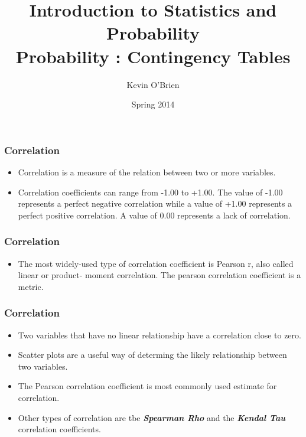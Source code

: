 \documentclass[a4]{beamer}
\title[Stats-Lab.com]{\LARGE Introduction to Statistics and Probability \\ {\Large Probability : Contingency Tables}}
\author[Kevin O'Brien]{Kevin O'Brien}
\date{Spring 2014}
\begin{document}
\begin{frame}
\titlepage
\end{frame}
%
\begin{frame}
\frametitle{Correlation}
\Large
\begin{itemize}
\item Correlation is a measure of the relation between two or more variables. 
\item Correlation coefficients can range from -1.00 to +1.00. The value of -1.00 represents a perfect negative correlation while a value of +1.00 represents a perfect positive correlation. A value of 0.00 represents a lack of correlation.
\end{itemize}
 


\end{frame}
\begin{frame}
\frametitle{Correlation}
\Large
\begin{itemize}

\item 
The most widely-used type of correlation coefficient is Pearson r, also called linear or product- moment correlation.
The pearson correlation coefficient is a metric.
\end{itemize}
 


\end{frame}

\begin{frame}
\frametitle{Correlation}
\Large
\begin{itemize}
\item  Two variables that have no linear relationship have a correlation close to zero. 

\item Scatter plots are a useful way of determing the likely relationship between two variables. 

\item The Pearson correlation coefficient is most commonly used estimate for correlation. 

\item Other types of correlation are tbe \textit{\textbf{Spearman Rho}} and the \textit{\textbf{Kendal Tau}} correlation coefficients. 

\end{itemize}
\end{frame}
\end{document}
